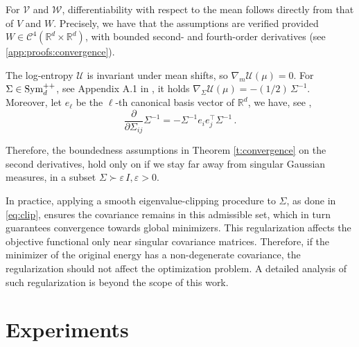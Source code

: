 \documentclass{article}
\theoremstyle{plain}
\theoremstyle{definition}
\theoremstyle{remark}
\newcommand{\Rd}{ {\mathbb{R}^d}}
\newcommand{\ve}{\varepsilon}
\newcommand{\pd}{\textup{Sym}^{++}_d}
\newcommand{\rev}{}
\begin{document}
For $\mathcal{V}$ and $\mathcal{W}$, differentiability with respect to the mean follows directly from that of $V$ and $W$.  Precisely, we have that the assumptions are verified provided $W \in \mathcal{C}^4(\mathbb{R}^d\times \Rd)$, with bounded second- and fourth-order derivatives (see \cref{app:proofs:convergence}).

The log-entropy $\mathcal{U}$ is invariant under mean shifts, so $\nabla_m \mathcal{U}(\mu) = 0$.  
For $\Sigma \in \pd$, see Appendix A.1 in \citep{lambert2022variational},  it holds
$\nabla_\Sigma \mathcal{U}(\mu) = -(1/2)\,\Sigma^{-1}$.
Moreover, let $e_\ell$ be the $\ell$-th canonical basis vector of $\mathbb{R}^d$, we have, see \cite{giles2008matrix}, 
\[\frac{\partial}{\partial \Sigma_{ij}} \Sigma^{-1} = -\Sigma^{-1} e_i e_j^{\top} \Sigma^{-1}\,.\]

Therefore, the boundedness assumptions in Theorem \ref{t:convergence} on the second derivatives, hold only on if we stay far away from singular Gaussian measures, in a subset $\Sigma \succ \ve\,I, \ve >0$.


In practice, applying a smooth eigenvalue-clipping procedure to $\Sigma$, as done in \eqref{eq:clip}, ensures the covariance remains in this admissible set, which in turn guarantees convergence towards global minimizers.  \rev{This regularization affects the objective functional only near singular covariance matrices. Therefore, if the minimizer of the original energy has a non-degenerate covariance, the regularization should not affect the optimization problem.}
A detailed analysis of such regularization is beyond the scope of this work.



\section{Experiments}
\label{sec:num}

\renewcommand{\algorithmicfor}{\textbf{for (parallel)}}
\end{document}
